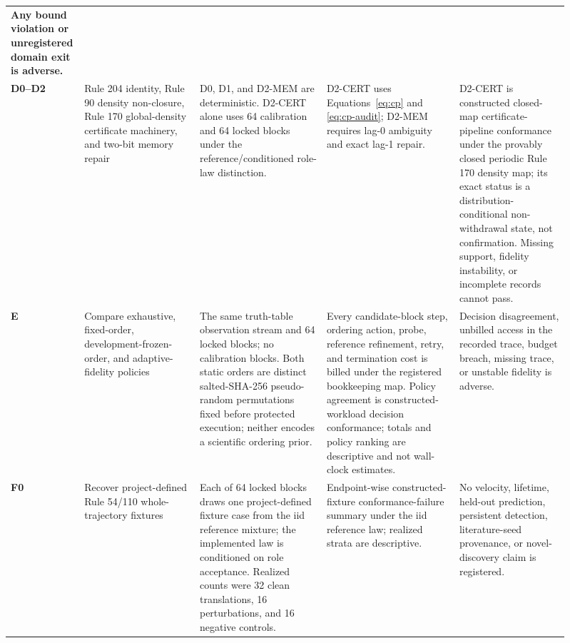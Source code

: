\begin{longtable}{>{\bfseries}p{0.07\linewidth}p{0.20\linewidth}p{0.22\linewidth}
p{0.23\linewidth}p{0.19\linewidth}}
Any bound violation or unregistered domain exit is adverse.\\
D0--D2 & Rule 204 identity, Rule 90 density non-closure, Rule 170 global-density certificate
machinery, and two-bit memory repair &
D0, D1, and D2-MEM are deterministic. D2-CERT alone uses 64 calibration and 64 locked blocks under
the reference/conditioned role-law distinction. &
D2-CERT uses Equations~\eqref{eq:cp} and \eqref{eq:cp-audit}; D2-MEM requires lag-0 ambiguity and
exact lag-1 repair. &
D2-CERT is constructed closed-map certificate-pipeline conformance under the provably closed periodic Rule 170 density
map; its exact status is a distribution-conditional non-withdrawal state, not confirmation. Missing
support, fidelity instability, or incomplete records cannot pass.\\
E & Compare exhaustive, fixed-order, development-frozen-order, and adaptive-fidelity policies &
The same truth-table observation stream and 64 locked blocks; no calibration blocks. Both static
orders are distinct salted-SHA-256 pseudo-random permutations fixed before protected execution;
neither encodes a scientific ordering prior. &
Every candidate-block step, ordering action, probe, reference refinement, retry, and termination
cost is billed under the registered bookkeeping map. Policy agreement is constructed-workload
decision conformance; totals and policy ranking are descriptive and not wall-clock estimates. &
Decision disagreement, unbilled access in the recorded trace, budget breach, missing trace, or unstable fidelity is
adverse.\\
F0 & Recover project-defined Rule 54/110 whole-trajectory fixtures &
Each of 64 locked blocks draws one project-defined fixture case from the iid reference mixture;
the implemented law is conditioned on role acceptance. Realized counts were 32 clean translations,
16 perturbations, and 16 negative controls. &
Endpoint-wise constructed-fixture conformance-failure summary under the iid reference law; realized
strata are descriptive. &
No velocity, lifetime, held-out prediction, persistent detection, literature-seed provenance, or
novel-discovery claim is registered.\\
\bottomrule
\end{longtable}
\endgroup

